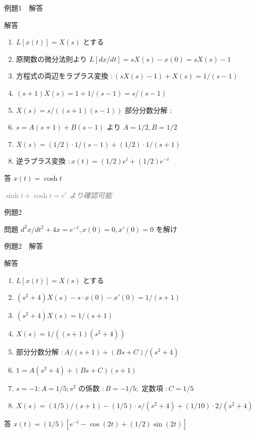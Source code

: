 \documentclass[aspectratio=43,professionalfonts,handout]{beamer}
\begin{document}
\begin{frame}{例題1　解答}
  \begin{exampleblock}{解答}
  \begin{enumerate}[1.]
    \item[] $L[x(t)] = X(s)$ とする
    \item[] 原関数の微分法則より $L[dx/dt] = sX(s) - x(0) = sX(s) - 1$
    \item[] 方程式の両辺をラプラス変換 $: (sX(s) - 1) + X(s) = 1/(s-1)$
    \item[] $(s+1)X(s) = 1 + 1/(s-1) = s/(s-1)$
    \item[] $X(s) = s/((s+1)(s-1))$ 部分分数分解 :
    \item[] $s = A(s+1) + B(s-1)$ より $A = 1/2, B = 1/2$
    \item[] $X(s) = (1/2)\cdot1/(s-1) + (1/2)\cdot1/(s+1)$
    \item[] 逆ラプラス変換 $: x(t) = (1/2)e^t + (1/2)e^{-t}$
  \end{enumerate}
  \end{exampleblock}
  \begin{alertblock}{答}
    $x(t) = \cosh t$
  \end{alertblock}
  {\footnotesize \textcolor{gray}{\textit{$\sinh t + \cosh t = e^t$ より確認可能}}}
\end{frame}

\begin{frame}{例題2}
  \begin{exampleblock}{問題}
    $d^{2}x/dt^{2} + 4x = e^{-t}, x(0) = 0, x'(0) = 0$ を解け\\[2pt]
  \end{exampleblock}
\end{frame}

\begin{frame}{例題2　解答}
  \begin{exampleblock}{解答}
  \begin{enumerate}[1.]
    \item[] $L[x(t)] = X(s)$ とする
    \item[] $(s^{2}+4)X(s) - s\cdot x(0) - x'(0) = 1/(s+1)$
    \item[] $(s^{2}+4)X(s) = 1/(s+1)$
    \item[] $X(s) = 1/((s+1)(s^{2}+4))$
    \item[] 部分分数分解 $: A/(s+1) + (Bs+C)/(s^{2}+4)$
    \item[] $1 = A(s^{2}+4) + (Bs+C)(s+1)$
    \item[] $s=-1: A = 1/5; s^{2}$ の係数 $: B = -1/5;$ 定数項 $: C = 1/5$
    \item[] $X(s) = (1/5)/(s+1) - (1/5)\cdot s/(s^{2}+4) + (1/10)\cdot2/(s^{2}+4)$
  \end{enumerate}
  \end{exampleblock}
  \begin{alertblock}{答}
    $x(t) = (1/5)[e^{-t} - \cos(2t) + (1/2)\sin(2t)]$
  \end{alertblock}
\end{frame}
\end{document}
